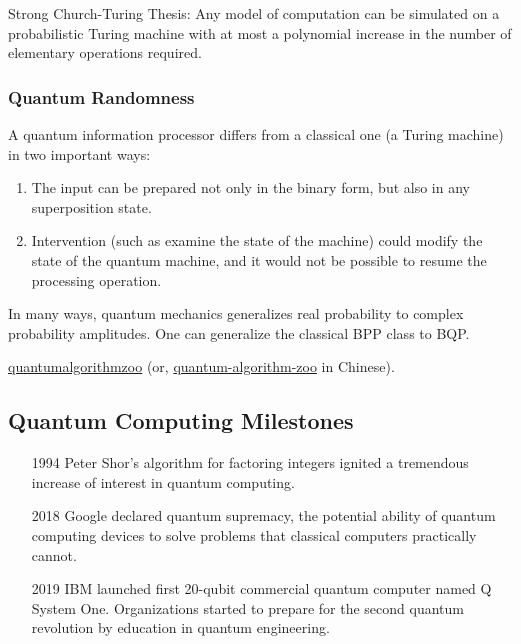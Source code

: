 Strong Church-Turing Thesis: Any model of computation can be simulated on a probabilistic Turing machine with at most a polynomial increase in the number of elementary operations required.

\quad

\subsubsection{Quantum Randomness}
A quantum information processor differs from a classical
one (a Turing machine) in two important ways: 
\begin{enumerate}
    \item The input can be prepared not only in the binary form, but also in any superposition state.
    \item Intervention (such as examine the state of the machine) could modify the state of the quantum machine, and it would not be possible to resume the processing operation. 
\end{enumerate}

In many ways, quantum mechanics generalizes real probability to complex probability amplitudes. One can generalize the classical BPP class to BQP. 

\href{https://quantumalgorithmzoo.org}{quantumalgorithmzoo} (or, \href{https://www.qtumist.com/quantum-algorithm-zoo}{quantum-algorithm-zoo} in Chinese).

\subsection{Quantum Computing Milestones}
\begin{itemize}
    \item [1994] Peter Shor’s algorithm for factoring integers ignited a tremendous increase of interest in quantum computing.
    \item [2018] Google declared quantum supremacy, the potential ability of quantum computing devices to solve problems that classical computers practically cannot.
    \item [2019] IBM launched first 20-qubit commercial quantum computer named Q System One. Organizations started to prepare for the second quantum revolution by education in quantum engineering.
\end{itemize}
